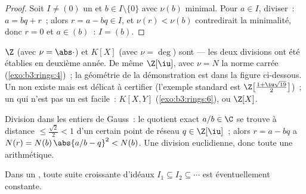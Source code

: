 \begin{proof}
Soit $I \neq (0)$ un  et $b \in I \setminus\{0\}$ avec
$\nu(b)$ minimal. Pour $a \in I$, diviser~: $a = bq + r$~; alors
$r = a - bq \in I$, et $\nu(r) < \nu(b)$ contredirait la
minimalité, donc $r = 0$ et $a \in (b)$~: $I = (b)$.
\end{proof}

\begin{example}\label{ex:b3:rings:euclidean}
$\Z$ (avec $\nu = \abs\cdot$) et $K[X]$ (avec $\nu = \deg$) sont
 --- les deux divisions ont été établies en deuxième
année. De même $\Z[\iu]$, avec $\nu = N$ la norme carrée
(\cref{exo:b3:rings:4})~; la géométrie de la démonstration est
dans la figure ci-dessous. Un  non  existe mais est
délicat à certifier (l'exemple standard est
$\Z\bigl[\frac{1+\iu\sqrt{19}}2\bigr]$)~; un  qui n'est pas
un  est facile~: $K[X, Y]$ (\cref{exo:b3:rings:6}), ou
$\Z[X]$.
\end{example}

\begin{omfigure}

{\small Division dans les entiers de Gauss~: le quotient exact
$a/b \in \C$ se trouve à distance $\leq \frac{\sqrt2}{2} < 1$
d'un certain point de réseau $q \in \Z[\iu]$~; alors $r = a -
bq$ a $N(r) = N(b)\,\abs{a/b - q}^2 < N(b)$. Une division
euclidienne, donc toute une arithmétique.}
\end{omfigure}

\begin{lemma}
\label{lem:b3:rings:acc}
Dans un , toute suite croissante d'idéaux $I_1 \subseteq I_2
\subseteq \cdots$ est éventuellement constante.
\end{lemma}

